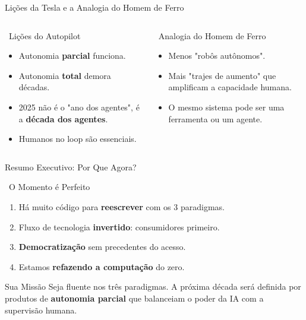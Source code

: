 \documentclass[aspectratio=169,12pt]{beamer}
\begin{document}
\begin{frame}{Lições da Tesla e a Analogia do Homem de Ferro}
    \begin{columns}
        \begin{column}{0.5\textwidth}
            \begin{block}{\faCar\, Lições do Autopilot}
                \begin{itemize}
                    \item Autonomia \textbf{parcial} funciona.
                    \item Autonomia \textbf{total} demora décadas.
                    \item 2025 não é o "ano dos agentes", é a \textbf{década dos agentes}.
                    \item Humanos no loop são essenciais.
                \end{itemize}
            \end{block}
        \end{column}
        \begin{column}{0.5\textwidth}
            \begin{exampleblock}{\faUserTie\, Analogia do Homem de Ferro}
                \begin{itemize}
                    \item Menos "robôs autônomos".
                    \item Mais "trajes de aumento" que amplificam a capacidade humana.
                    \item O mesmo sistema pode ser uma ferramenta ou um agente.
                \end{itemize}
            \end{exampleblock}
        \end{column}
    \end{columns}
\end{frame}

\begin{frame}{Resumo Executivo: Por Que Agora?}
    \begin{block}{\faRocket\, O Momento é Perfeito}
        \begin{enumerate}
            \item Há muito código para \textbf{reescrever} com os 3 paradigmas.
            \item Fluxo de tecnologia \textbf{invertido}: consumidores primeiro.
            \item \textbf{Democratização} sem precedentes do acesso.
            \item Estamos \textbf{refazendo a computação} do zero.
        \end{enumerate}
    \end{block}
    
    \begin{alertblock}{Sua Missão}
        Seja fluente nos três paradigmas. A próxima década será definida por produtos de \textbf{autonomia parcial} que balanceiam o poder da IA com a supervisão humana.
    \end{alertblock}
\end{frame}
\end{document}
